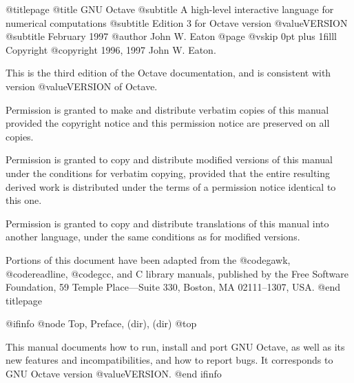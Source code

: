 @titlepage
@title GNU Octave
@subtitle A high-level interactive language for numerical computations
@subtitle Edition 3 for Octave version @value{VERSION}
@subtitle February 1997
@author John W. Eaton
@page
@vskip 0pt plus 1filll
Copyright @copyright{} 1996, 1997 John W. Eaton.

This is the third edition of the Octave documentation, and is consistent
with version @value{VERSION} of Octave.

Permission is granted to make and distribute verbatim copies of
this manual provided the copyright notice and this permission notice
are preserved on all copies.

Permission is granted to copy and distribute modified versions of this
manual under the conditions for verbatim copying, provided that the entire
resulting derived work is distributed under the terms of a permission
notice identical to this one.

Permission is granted to copy and distribute translations of this manual
into another language, under the same conditions as for modified versions.

Portions of this document have been adapted from the @code{gawk},
@code{readline}, @code{gcc}, and C library manuals, published by the Free
Software Foundation, 59 Temple Place---Suite 330, Boston, MA
02111--1307, USA.
@end titlepage

@ifinfo
@node Top, Preface, (dir), (dir)
@top

This manual documents how to run, install and port GNU Octave, as well
as its new features and incompatibilities, and how to report bugs.
It corresponds to GNU Octave version @value{VERSION}.
@end ifinfo

